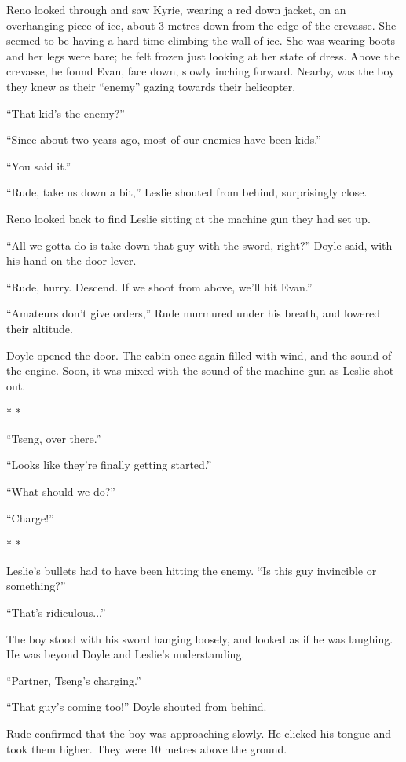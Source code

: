 \documentclass[oneside]{book}
\begin{document}
Reno looked through and saw Kyrie, wearing a red down jacket, on an overhanging piece of ice, about 3 metres down from the edge of the crevasse. She seemed to be having a hard time climbing the wall of ice. She was wearing boots and her legs were bare; he felt frozen just looking at her state of dress. Above the crevasse, he found Evan, face down, slowly inching forward. Nearby, was the boy they knew as their “enemy” gazing towards their helicopter.

“That kid’s the enemy?”

“Since about two years ago, most of our enemies have been kids.”

“You said it.”

“Rude, take us down a bit,” Leslie shouted from behind, surprisingly close.

Reno looked back to find Leslie sitting at the machine gun they had set up.

“All we gotta do is take down that guy with the sword, right?” Doyle said, with his hand on the door lever.

“Rude, hurry. Descend. If we shoot from above, we’ll hit Evan.”

“Amateurs don’t give orders,” Rude murmured under his breath, and lowered their altitude.

Doyle opened the door. The cabin once again filled with wind, and the sound of the engine. Soon, it was mixed with the sound of the machine gun as Leslie shot out.

* *

“Tseng, over there.”

“Looks like they’re finally getting started.”

“What should we do?”

“Charge!”

* *

Leslie’s bullets had to have been hitting the enemy. “Is this guy invincible or something?”

“That’s ridiculous...”

The boy stood with his sword hanging loosely, and looked as if he was laughing. He was beyond Doyle and Leslie’s understanding.

“Partner, Tseng’s charging.”

“That guy’s coming too!” Doyle shouted from behind.

Rude confirmed that the boy was approaching slowly. He clicked his tongue and took them higher. They were 10 metres above the ground.
\end{document}

